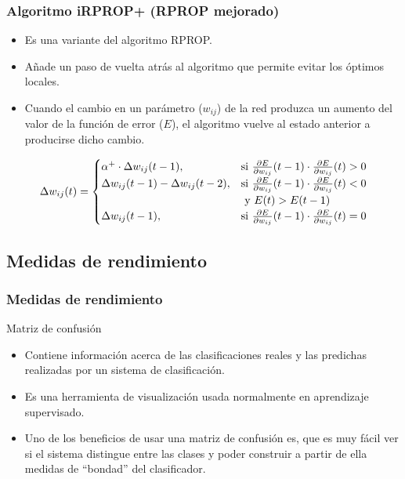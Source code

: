 \documentclass[compress,allowframebreaks]{beamer}
\begin{document}
			\begin{frame}
				\frametitle{\normalsize Algoritmo iRPROP+ (RPROP mejorado)}

					\begin{itemize}\justifying
						\item \small Es una variante del algoritmo RPROP.
						\item \small Añade un paso de vuelta atrás al algoritmo que permite evitar los óptimos locales.
						\item \small Cuando el cambio en un parámetro ($w_{ij}$) de la red produzca un aumento del valor de la función de error ($E$), el algoritmo vuelve al estado anterior a producirse dicho cambio.
					\end{itemize}
	
					\begin{equation}
						\centering
						\Delta w_{ij} (t) = 
						\begin{cases}
							{ \alpha^+ \cdot{} \Delta w_{ij}(t-1),} & \mbox{si } \frac{ \partial E}{ \partial w_{ij}}(t-1) \cdot{} \frac{ \partial E}{ \partial w_{ij}}(t) > 0 \nonumber \\
							{ \Delta w_{ij}(t-1)-\Delta w_{ij}(t-2),} & \mbox{si } \frac{ \partial E}{ \partial w_{ij}}(t-1) \cdot{} \frac{ \partial E}{ \partial w_{ij}}(t) < 0 \nonumber \\
					& \mbox{ y } E(t) > E(t-1) \\
							\Delta w_{ij}(t-1), & \mbox{si } \frac{ \partial E}{ \partial w_{ij}}(t-1) \cdot{} \frac{ \partial E}{ \partial w_{ij}}(t) = 0 \nonumber
						\end{cases}
					\end{equation}
			\end{frame}
			
		\subsection{Medidas de rendimiento}

			\begin{frame}
				\frametitle{\normalsize Medidas de rendimiento}
	
				\begin{block}{Matriz de confusión}
					\begin{itemize}\justifying
						\item Contiene información acerca de las clasificaciones reales y las predichas realizadas por un sistema de clasificación.
						\item Es una herramienta de visualización usada normalmente en aprendizaje supervisado.
						\item Uno de los beneficios de usar una matriz de confusión es, que es muy fácil ver si el sistema distingue entre las clases y poder construir a partir de ella medidas de ``bondad'' del clasificador.
					\end{itemize}
				\end{block}
			\end{frame}
					
\end{document}
